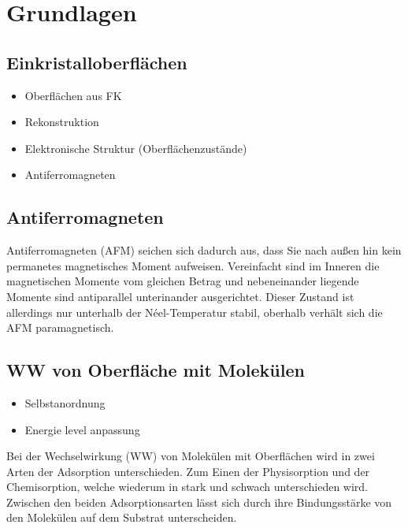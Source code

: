 \chapter{Grundlagen}
    \section{Einkristalloberflächen}
        \begin{itemize}
            \item Oberflächen aus FK
            \item Rekonstruktion
            \item Elektronische Struktur (Oberflächenzustände)
            \item Antiferromagneten
        \end{itemize}

    \section{Antiferromagneten}
        Antiferromagneten (AFM) seichen sich dadurch aus, dass Sie nach außen hin kein permanetes magnetisches Moment aufweisen.
        Vereinfacht sind im Inneren die magnetischen Momente vom gleichen Betrag und nebeneinander liegende Momente sind antiparallel unterinander ausgerichtet.
        Dieser Zustand ist allerdings nur unterhalb der Néel-Temperatur stabil, oberhalb verhält sich die AFM paramagnetisch.
    
    \section{WW von Oberfläche mit Molekülen}
        \cite{ma-DJ}
        \begin{itemize}
            \item Selbstanordnung
            \item Energie level anpassung
        \end{itemize}
        Bei der Wechselwirkung (WW) von Molekülen mit Oberflächen wird in zwei Arten der Adsorption unterschieden. 
        Zum Einen der Physisorption und der Chemisorption, welche wiederum in stark und schwach unterschieden wird.
        Zwischen den beiden Adsorptionsarten lässt sich durch ihre Bindungsstärke von den Molekülen auf dem Substrat unterscheiden.

